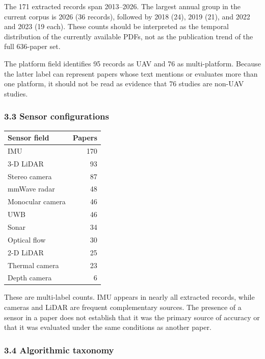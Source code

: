 \documentclass[
  journal]{IEEEtran}
\newcounter{none} %
\begin{document}
The 171 extracted records span 2013--2026. The largest annual group in
the current corpus is 2026 (36 records), followed by 2018 (24), 2019
(21), and 2022 and 2023 (19 each). These counts should be interpreted as
the temporal distribution of the currently available PDFs, not as the
publication trend of the full 636-paper set.

The platform field identifies 95 records as UAV and 76 as
multi-platform. Because the latter label can represent papers whose text
mentions or evaluates more than one platform, it should not be read as
evidence that 76 studies are non-UAV studies.

\subsubsection{3.3 Sensor
configurations}\label{33-sensor-configurations}

{\def\LTcaptype{none} %
\begin{longtable}[]{@{}lr@{}}
\toprule\noalign{}
Sensor field & Papers \\
\midrule\noalign{}
\endhead
\bottomrule\noalign{}
\endlastfoot
IMU & 170 \\
3-D LiDAR & 93 \\
Stereo camera & 87 \\
mmWave radar & 48 \\
Monocular camera & 46 \\
UWB & 46 \\
Sonar & 34 \\
Optical flow & 30 \\
2-D LiDAR & 25 \\
Thermal camera & 23 \\
Depth camera & 6 \\
\end{longtable}
}

These are multi-label counts. IMU appears in nearly all extracted
records, while cameras and LiDAR are frequent complementary sources. The
presence of a sensor in a paper does not establish that it was the
primary source of accuracy or that it was evaluated under the same
conditions as another paper.

\subsubsection{3.4 Algorithmic taxonomy}\label{34-algorithmic-taxonomy}
\end{document}
